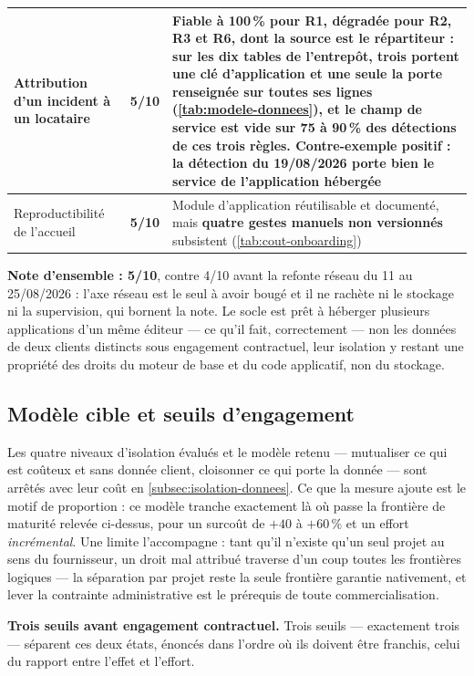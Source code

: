 {\begin{longtable}{|P{3.2cm}|P{1.0cm}|P{11.1cm}|}
Attribution d'un incident à un locataire & \textbf{5/10} & Fiable à 100\,\% pour R1, dégradée pour
R2, R3 et R6, dont la source est le répartiteur : sur les dix tables de l'entrepôt, \textbf{trois
portent une clé d'application et une seule la porte renseignée sur toutes ses lignes}
(\cref{tab:modele-donnees}), et le champ de service est vide sur 75 à 90\,\% des détections de ces
trois règles. Contre-exemple positif : la détection du 19/08/2026 porte bien le service de
l'application hébergée \\ \hline
Reproductibilité de l'accueil & \textbf{5/10} & Module d'application réutilisable et documenté,
mais \textbf{quatre gestes manuels non versionnés} subsistent
(\cref{tab:cout-onboarding}) \\
\hline
\end{longtable}
}

\textbf{Note d'ensemble : 5/10}, contre 4/10 avant la refonte réseau du 11 au 25/08/2026 : l'axe
réseau est le seul à avoir bougé et il ne rachète ni le stockage ni la supervision, qui bornent la
note. Le socle est prêt à héberger plusieurs applications d'un même éditeur --- ce qu'il fait,
correctement --- non les données de deux clients distincts sous engagement contractuel, leur
isolation y restant une propriété des droits du moteur de base et du code applicatif, non du
stockage.

\subsection{Modèle cible et seuils d'engagement}

Les quatre niveaux d'isolation évalués et le modèle retenu --- mutualiser ce qui est coûteux et
sans donnée client, cloisonner ce qui porte la donnée --- sont arrêtés avec leur coût en
\cref{subsec:isolation-donnees}. Ce que la mesure ajoute est le motif de proportion : ce modèle
tranche exactement là où passe la frontière de maturité relevée ci-dessus, pour un surcoût de $+40$
à $+60\,\%$ et un effort \emph{incrémental}. Une limite l'accompagne : tant qu'il n'existe qu'un
seul projet au sens du fournisseur, un droit mal attribué traverse d'un coup toutes les frontières
logiques --- la séparation par projet reste la seule frontière garantie nativement, et lever la
contrainte administrative est le prérequis de toute commercialisation.

\medskip
\noindent\textbf{Trois seuils avant engagement contractuel.} Trois seuils --- exactement trois ---
séparent ces deux états, énoncés dans l'ordre où ils doivent être franchis, celui du rapport entre
l'effet et l'effort.

